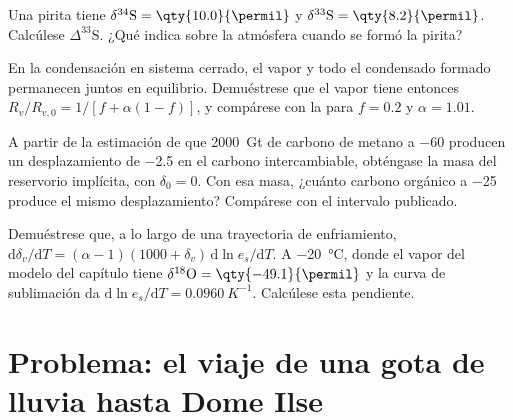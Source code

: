 \begin{exercise}[$\star\star$]\label{exo:b3:stable-isotopes:9}
Una pirita tiene $\delta^{34}\mathrm S = \qty{10.0}{\permil}$ y $\delta^{33}\mathrm S =
\qty{8.2}{\permil}$. Calcúlese $\Delta^{33}\mathrm S$. ¿Qué indica sobre la
atmósfera cuando se formó la pirita?
\end{exercise}

\begin{exercise}[$\star\star\star$]\label{exo:b3:stable-isotopes:10}
En la condensación en sistema cerrado, el vapor y todo el condensado formado permanecen
juntos en equilibrio. Demuéstrese que el vapor tiene entonces $R_v/R_{v,0} = 1/[f +
\alpha(1 - f)]$, y compárese con la  para $f = 0.2$ y
$\alpha = 1.01$.
\end{exercise}

\begin{exercise}[$\star\star\star$]\label{exo:b3:stable-isotopes:11}
A partir de la estimación de que \qty{2000}{Gt} de carbono de metano a
\qty{-60}{\permil} producen un desplazamiento de \qty{-2.5}{\permil} en el carbono intercambiable,
obténgase la masa del reservorio implícita, con $\delta_0 = 0$. Con esa masa, ¿cuánto
carbono orgánico a \qty{-25}{\permil} produce el mismo desplazamiento? Compárese con el
intervalo publicado.
\end{exercise}

\begin{exercise}[$\star\star\star$]\label{exo:b3:stable-isotopes:12}
Demuéstrese que, a lo largo de una trayectoria de enfriamiento, $\mathrm d\delta_v/\mathrm dT = (\alpha - 1)(1000 +
\delta_v)\,\mathrm d\ln e_s/\mathrm dT$. A \qty{-20}{\celsius}, donde el
vapor del modelo del capítulo tiene $\delta^{18}\mathrm O = \qty{-49.1}{\permil}$
y la curva de sublimación da $\mathrm d\ln e_s/\mathrm dT =
\qty{0.0960}{K^{-1}}$. Calcúlese esta pendiente.
\end{exercise}

\section{Problema: el viaje de una gota de lluvia hasta Dome Ilse}

